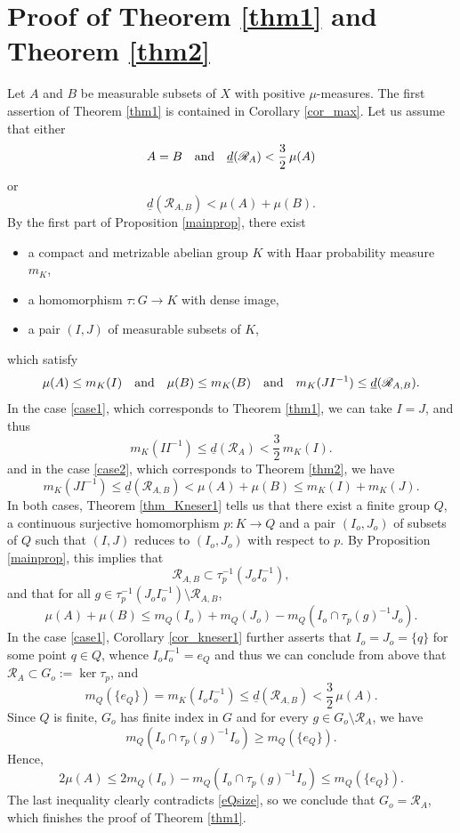 \documentclass[10pt]{amsart}
\let\mathcal\mathscr
\newcommand{\cR}{\mathcal{R}}
\newcommand{\qand}{\quad\textup{and}\quad}
\theoremstyle{plain}
\theoremstyle{definition}
\begin{document}
\section{Proof of Theorem \ref{thm1} and Theorem \ref{thm2}}

Let $A$ and $B$ be measurable subsets of $X$ with positive $\mu$-measures. The first assertion of Theorem \ref{thm1} is contained
in Corollary \ref{cor_max}. Let us assume that either
\begin{equation}
\label{case1}
A = B \qand \underline{d}(\cR_{A}) < \frac{3}{2}\, \mu(A)
\end{equation}
or
\begin{equation}
\label{case2}
\underline{d}(\cR_{A,B}) < \mu(A) + \mu(B).
\end{equation}
By the first part of Proposition \ref{mainprop}, there exist
\begin{itemize}
\item a compact and metrizable abelian group $K$ with Haar probability measure $m_K$,
\item a homomorphism $\tau : G \to K$ with dense image,
\item a pair $(I,J)$ of measurable subsets of $K$,
\end{itemize}
which satisfy
\[
\mu(A) \leq m_K(I) \qand \mu(B) \leq m_K(B) \qand m_K(JI^{-1}) \leq \underline{d}(\cR_{A,B}).
\]
In the case \eqref{case1}, which corresponds to Theorem \ref{thm1}, we can take $I = J$, and thus
\[
m_K(II^{-1}) \leq \underline{d}(\cR_{A}) < \frac{3}{2} \, m_K(I).
\]
and in the case \eqref{case2}, which corresponds to Theorem \ref{thm2}, we have
\[
m_K(JI^{-1}) \leq \underline{d}(\cR_{A,B}) < \mu(A) + \mu(B) \leq m_K(I) + m_K(J).
\]
In both cases, Theorem \ref{thm_Kneser1} tells us that there exist a finite group $Q$, a continuous surjective homomorphism
$p : K \to Q$ and a pair $(I_o,J_o)$ of subsets of $Q$ such that $(I,J)$ reduces to $(I_o,J_o)$ with respect to $p$.
By Proposition \ref{mainprop}, this implies that
\[
\cR_{A,B} \subset \tau_p^{-1}(J_o I_o^{-1}),
\]
and that for all $g \in \tau_p^{-1}(J_o I_o^{-1}) \setminus \cR_{A,B}$,
\[
\mu(A) + \mu(B) \leq m_Q(I_o) + m_Q(J_o) - m_Q(I_o \cap \tau_p(g)^{-1}J_o).
\]
In the case \eqref{case1}, Corollary \ref{cor_kneser1} further asserts that $I_o = J_o = \{q\}$ for some point $q \in Q$, whence
$I_o I_o^{-1} = e_Q$ and thus we can conclude from above that $\cR_{A} \subset G_o := \ker \tau_p$, and
\begin{equation}
\label{eQsize}
m_Q(\{e_Q\}) = m_K(I_o I_o^{-1}) \leq \underline{d}(\cR_{A,B}) < \frac{3}{2}\, \mu(A).
\end{equation}
Since $Q$ is finite, $G_o$ has finite index in $G$ and for every $g \in G_o \setminus \cR_A$, we have
\[
m_Q(I_o \cap \tau_p(g)^{-1}I_o) \geq m_Q(\{e_Q\}).
\]
Hence,
\[
2\mu(A) \leq 2m_Q(I_o) - m_Q(I_o \cap \tau_p(g)^{-1}I_o) \leq m_Q(\{e_Q\}).
\]
The last inequality clearly contradicts \eqref{eQsize}, so we conclude that $G_o = \cR_A$, which finishes the proof of Theorem \ref{thm1}.
\end{document}
